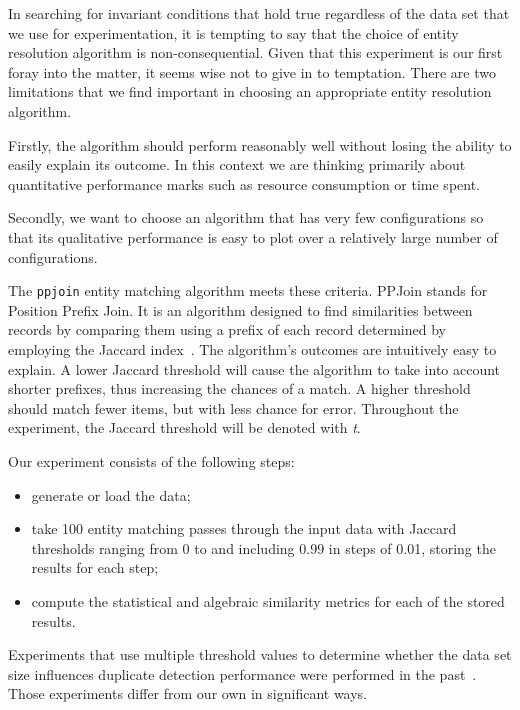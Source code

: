 In searching for invariant conditions that hold true regardless of the data set
that we use for experimentation, it is tempting to say that the choice of entity
resolution algorithm is non-consequential.
Given that this experiment is our first foray into the matter, it seems wise not
to give in to temptation.
There are two limitations that we find important in choosing an appropriate
entity resolution algorithm.

Firstly, the algorithm should perform reasonably well without losing the ability
to easily explain its outcome.
In this context we are thinking primarily about quantitative performance marks
such as resource consumption or time spent.

Secondly, we want to choose an algorithm that has very few configurations so
that its qualitative performance is easy to plot over a relatively large  number
of configurations.

The \texttt{ppjoin}\cite{ppjoin} entity matching algorithm meets these criteria.
PPJoin stands for Position Prefix Join.
It is an algorithm designed to find similarities between records by comparing
them using a prefix of each record determined by employing the Jaccard
index~\cite{jaccard1912,finley1996}.
The algorithm's outcomes are intuitively easy to explain.
A lower Jaccard threshold will cause the algorithm to take into account shorter
prefixes, thus increasing the chances of a match.
A higher threshold should match fewer items, but with less chance for error.
Throughout the experiment, the Jaccard threshold will be denoted with \textit{t}.

Our experiment consists of the following steps:

\begin{itemize}
    \item generate or load the data;
    \item take 100 entity matching passes through the input data with
          Jaccard thresholds ranging from 0 to and including 0.99 in steps of
          0.01, storing the results for each step;
    \item compute the statistical and algebraic similarity metrics for each
          of the stored results.
\end{itemize}

Experiments that use multiple threshold values to determine whether the data
set size influences duplicate detection performance were performed in the
past~\cite{draisbach2013choosing}.
Those experiments differ from our own in significant ways.

